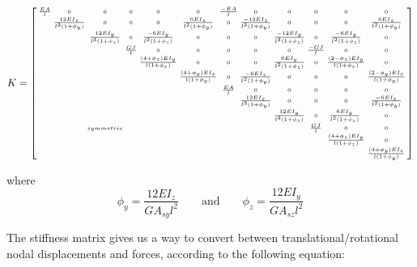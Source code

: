 {\[ K =  \scriptsize {\left[ \begin{smallmatrix}
\tfrac{EA}{l} & 0 & 0 & 0 & 0 & 0 & \tfrac{-EA}{l} & 0 & 0 & 0 & 0 & 0\\
 & \tfrac{12EI_z}{l^3(1+\phi_y)} & 0 & 0 & 0 & \tfrac{6EI_z}{l^2(1+\phi_y)} & 0 & \tfrac{-12EI_z}{l^3(1+\phi_y)} & 0 & 0 & 0 & \tfrac{6EI_z}{l^2(1+\phi_y)}\\
 &  & \tfrac{12EI_y}{l^3(1+\phi_z)} & 0 & \tfrac{-6EI_y}{l^2(1+\phi_z)} & 0 & 0 & 0 & \tfrac{-12EI_y}{l^3(1+\phi_z)} & 0 & \tfrac{-6EI_y}{l^2(1+\phi_z)} & 0\\
 &  &  &  \tfrac{GJ}{l} &  0 &  0 &  0 &  0 &  0 & \tfrac{-GJ}{l} & 0 & 0\\
 &  &  &  & \tfrac{(4+\phi_z)EI_y}{l(1+\phi_z)} & 0 & 0 & 0 & \tfrac{6EI_y}{l^2(1+\phi_z)} & 0 & \tfrac{(2-\phi_z)EI_y}{l(1+\phi_z)} & 0\\
 &  &  &  &  & \tfrac{(4+\phi_y)EI_z}{l(1+\phi_y)} & 0 & \tfrac{-6EI_z}{l^2(1+\phi_y)} & 0 & 0 & 0 & \tfrac{(2-\phi_y)EI_z}{l(1+\phi_y)}\\
 &  &  &  &  &  & \tfrac{EA}{l}  & 0 & 0 & 0 & 0 & 0\\
 &  &  &  &  &  &  & \tfrac{12EI_z}{l^3(1+\phi_y)} & 0 & 0 & 0 & \tfrac{-6EI_z}{l^2(1+\phi_y)}\\
 &  &  &  &  &  &  &  & \tfrac{12EI_y}{l^3(1+\phi_z)} & 0 & \tfrac{6EI_y}{l^2(1+\phi_z)}\ & 0\\
 &  & symmetric &  &  &  &  &  &  & \tfrac{GJ}{l} & 0 & 0\\
 &  &  &  &  &  &  &  &  &  & \tfrac{(4+\phi_z)EI_y}{l(1+\phi_z)} & 0\\
  &  &  &  &  &  &  &  &  &  &  & \tfrac{(4+\phi_y)EI_z}{l(1+\phi_y)}\\
 \end{smallmatrix} \right] }\]
 
 where
\[ \phi_y = \dfrac{12EI_z}{GA_{sy}l^2} \qquad  \textrm{and} \qquad \phi_z = \dfrac{12EI_y}{GA_{sz}l^2} \]


The stiffness matrix gives us a way to convert between translational/rotational nodal displacements and forces, according to the following equation:

}
